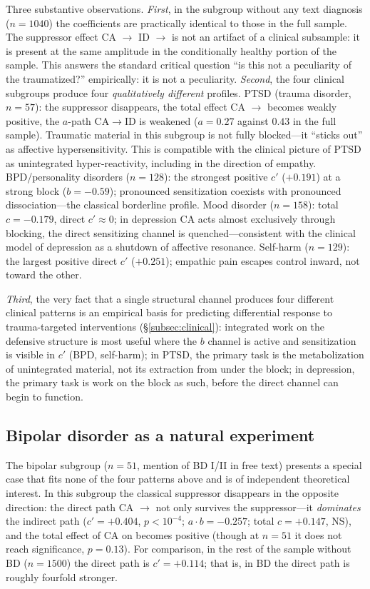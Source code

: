 Three substantive observations. \emph{First}, in the subgroup without any text diagnosis ($n=1040$) the coefficients are practically identical to those in the full sample. The suppressor effect CA $\to$ ID $\to$ \EAF{} is not an artifact of a clinical subsample: it is present at the same amplitude in the conditionally healthy portion of the sample. This answers the standard critical question ``is this not a peculiarity of the traumatized?'' empirically: it is not a peculiarity. \emph{Second}, the four clinical subgroups produce four \emph{qualitatively different} profiles. PTSD (trauma disorder, $n=57$): the suppressor disappears, the total effect CA $\to$ \EAF{} becomes weakly positive, the $a$-path $\mathrm{CA}\to\mathrm{ID}$ is weakened ($a = 0.27$ against $0.43$ in the full sample). Traumatic material in this subgroup is not fully blocked---it ``sticks out'' as affective hypersensitivity. This is compatible with the clinical picture of PTSD as unintegrated hyper-reactivity, including in the direction of empathy. BPD/personality disorders ($n=128$): the strongest positive $c'$ ($+0.191$) at a strong block ($b = -0.59$); pronounced sensitization coexists with pronounced dissociation---the classical borderline profile. Mood disorder ($n=158$): total $c = -0.179$, direct $c' \approx 0$; in depression CA acts almost exclusively through blocking, the direct sensitizing channel is quenched---consistent with the clinical model of depression as a shutdown of affective resonance. Self-harm ($n=129$): the largest positive direct $c'$ ($+0.251$); empathic pain escapes control inward, not toward the other.

\emph{Third}, the very fact that a single structural channel produces four different clinical patterns is an empirical basis for predicting differential response to trauma-targeted interventions (§\ref{subsec:clinical}): integrated work on the defensive structure is most useful where the $b$ channel is active and sensitization is visible in $c'$ (BPD, self-harm); in PTSD, the primary task is the metabolization of unintegrated material, not its extraction from under the block; in depression, the primary task is work on the block as such, before the direct channel can begin to function.

\subsection{Bipolar disorder as a natural experiment}
\label{subsec:bipolar_experiment}

The bipolar subgroup ($n=51$, mention of BD I/II in free text) presents a special case that fits none of the four patterns above and is of independent theoretical interest. In this subgroup the classical suppressor disappears in the opposite direction: the direct path CA $\to$ \EAF{} not only survives the suppressor---it \emph{dominates} the indirect path ($c' = +0.404$, $p < 10^{-4}$; $a \cdot b = -0.257$; total $c = +0.147$, NS), and the total effect of CA on \EAF{} becomes positive (though at $n=51$ it does not reach significance, $p = 0.13$). For comparison, in the rest of the sample without BD ($n=1500$) the direct path is $c' = +0.114$; that is, in BD the direct path is roughly fourfold stronger.

